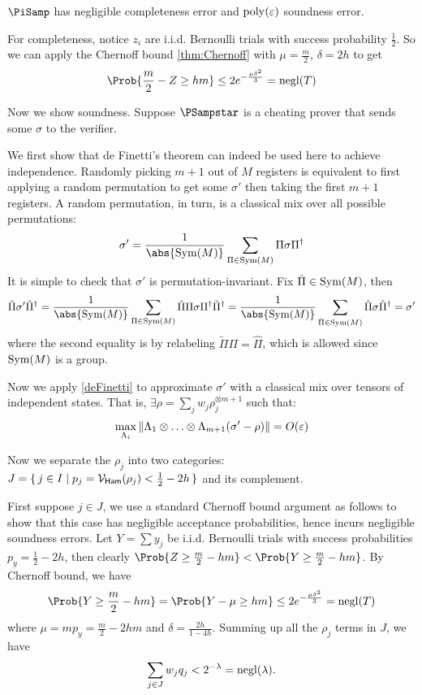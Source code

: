 \begin{thm}
    \label{QPIP1thm}
	$\PiSamp$ has negligible completeness error and $\operatorname*{\operatorname{poly}}(\varepsilon)$ soundness error.
\end{thm}
\begin{prf}
	For completeness, notice $z_i$ are i.i.d. Bernoulli trials with success probability $\frac{1}{2}$.
	So we can apply the Chernoff bound \cref{thm:Chernoff} with $\mu=\frac{m}{2}$, $\delta=2h$ to get
	$$\Prob{\frac{m}{2}-Z\geq hm}\leq2e^{-\frac{\mu\delta^2}{3}}=\negl(T)$$

	Now we show soundness.
	Suppose $\PSampstar$ is a cheating prover that sends some $\sigma$ to the verifier.

	We first show that de Finetti's theorem can indeed be used here to achieve independence.
	Randomly picking $m+1$ out of $M$ registers is equivalent to first applying a random permutation to get some $\sigma'$ then taking the first $m+1$ registers.
	A random permutation, in turn, is a classical mix over all possible permutations:
	$$\sigma'=\frac{1}{\abs{\Sym(M)}}\sum_{\Pi\in\Sym(M)}\Pi\sigma\Pi^\dagger$$
	It is simple to check that $\sigma'$ is permutation-invariant.
	Fix $\tilde{\Pi}\in\operatorname{Sym}(M)$, then
	$$\tilde{\Pi}\sigma'\tilde{\Pi}^\dagger
	=\frac{1}{\abs{\Sym(M)}}\sum_{\Pi\in\Sym(M)}\tilde{\Pi}\Pi\sigma\Pi^\dagger\tilde{\Pi}^\dagger
	=\frac{1}{\abs{\Sym(M)}}\sum_{\hat{\Pi}\in\Sym(M)}\hat{\Pi}\sigma\hat{\Pi}^\dagger
	=\sigma'$$
	where the second equality is by relabeling $\tilde{\Pi}\Pi=\hat{\Pi}$, which is allowed since $\operatorname{Sym}(M)$ is a group.

	Now we apply \cref{deFinetti} to approximate $\sigma'$ with a classical mix over tensors of independent states.
	That is, $\exists\rho=\sum_j w_j\rho_j^{\otimes m+1}$ such that:
	$$\max_{\Lambda_i}\left\lVert\Lambda_1\otimes\ldots\otimes\Lambda_{m+1}(\sigma'-\rho)\right\rVert=O(\varepsilon)$$

	Now we separate the $\rho_j$ into two categories: $J=\set{j\in I|p_j=\mathcal{V}_{\mathsf{Ham}}(\rho_j)<\frac{1}{2}-2h}$ and its complement.

	First suppose $j\in J$, we use a standard Chernoff bound argument as follows to show that this case has negligible acceptance probabilities,
	hence incurs negligible soundness errors.
	Let $Y=\sum y_j$ be i.i.d. Bernoulli trials with success probabilities $p_y=\frac{1}{2}-2h$,
	then clearly $\Prob{Z\geq\frac{m}{2}-hm}<\Prob{Y\geq\frac{m}{2}-hm}$.
	By Chernoff bound, we have
	$$\Prob{Y\geq\frac{m}{2}-hm}=\Prob{Y-\mu\geq hm}\leq2e^{-\frac{\mu\delta^2}{3}}=\negl(T)$$
	where $\mu=mp_y=\frac{m}{2}-2hm$ and $\delta=\frac{2h}{1-4h}$.
	Summing up all the $\rho_j$ terms in $J$, we have
	$$\sum_{j\in J} w_j q_j<2^{-\lambda}=\operatorname{negl}(\lambda).$$


\end{prf}
